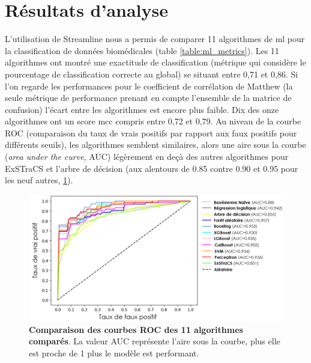 \section{Résultats d'analyse}
L'utilisation de Streamline nous a permis de comparer 11 algorithmes de \gls{ml} pour la classification de données biomédicales (table \ref{table:ml_metrics}). Les 11 algorithmes ont montré une exactitude de classification (métrique qui considère le pourcentage de classification correcte au global) se situant entre 0,71 et 0,86. Si l’on regarde les performances pour le coefficient de corrélation de Matthew (la seule métrique de performance prenant en compte l'ensemble de la matrice de confusion) l'écart entre les algorithmes est encore plus faible. Dix des onze algorithmes ont un score \gls{mcc} compris entre 0,72 et 0,79. Au niveau de la courbe ROC (comparaison du taux de vrais positifs par rapport aux faux positifs pour différents seuils), les algorithmes semblent similaires, alors une aire sous la courbe (\textit{area under the curve}, AUC) légèrement en deçà des autres algorithmes pour ExSTraCS et l'arbre de décision (aux alentours de 0.85 contre 0.90 et 0.95 pour les neuf autres, \ref{fig:roc_curve}).
\begin{figure}[!ht]
  \centering
  \includegraphics[width=1\textwidth]{figures/roc_streamline.png}
  \caption[Comparaison des courbes ROC]{\textbf{Comparaison des courbes ROC des 11 algorithmes comparés}. La valeur AUC représente l'aire sous la courbe, plus elle est proche de 1 plus le modèle est performant.}
  \label{fig:roc_curve}
\end{figure}
